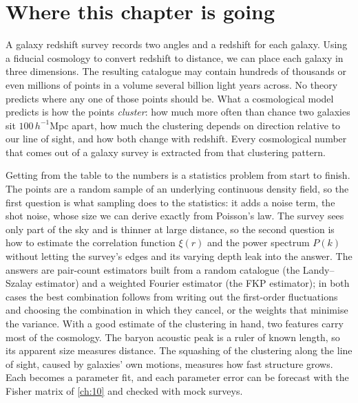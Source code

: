 \section*{Where this chapter is going}
\label{11a:sec:roadmap}

A galaxy redshift survey records two angles and a redshift for each galaxy.
Using a fiducial cosmology to convert redshift to distance, we can place each
galaxy in three dimensions. The resulting catalogue may contain hundreds of
thousands or even millions of points in a volume several billion light years across. No theory predicts where any one of
those points should be. What a cosmological model predicts is how the points
\emph{cluster}: how much more often than chance two galaxies sit $100\,h^{-1}$Mpc
apart, how much the clustering depends on direction relative to our line of
sight, and how both change with redshift. Every cosmological number that comes out
of a galaxy survey is extracted from that clustering pattern.

Getting from the table to the numbers is a statistics problem from start to
finish. The points are a random sample of an underlying continuous density field,
so the first question is what sampling does to the statistics: it adds a noise
term, the shot noise, whose size we can derive exactly from Poisson's law. The
survey sees only part of the sky and is thinner at large distance, so the second
question is how to estimate the correlation function $\xi(r)$ and the power
spectrum $P(k)$ without letting the survey's edges and its varying depth leak
into the answer. The answers are pair-count estimators built from a random
catalogue (the Landy--Szalay estimator) and a weighted Fourier estimator (the FKP
estimator); in both cases the best combination follows from writing out the
first-order fluctuations and choosing the combination in which they cancel, or
the weights that minimise the variance. With a good estimate of the clustering
in hand, two features carry most of the cosmology. The baryon acoustic peak is a
ruler of known length, so its apparent size measures distance. The squashing of
the clustering along the line of sight, caused by galaxies' own motions, measures
how fast structure grows. Each becomes a parameter fit, and each parameter error
can be forecast with the Fisher matrix of \cref{ch:10} and checked with mock
surveys.

